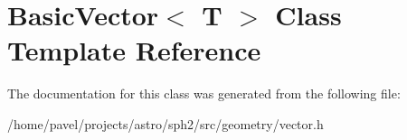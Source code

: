 \hypertarget{classBasicVector}{}\section{Basic\+Vector$<$ T $>$ Class Template Reference}
\label{classBasicVector}


The documentation for this class was generated from the following file\+:\begin{DoxyCompactItemize}
\item 
/home/pavel/projects/astro/sph2/src/geometry/vector.\+h\end{DoxyCompactItemize}
